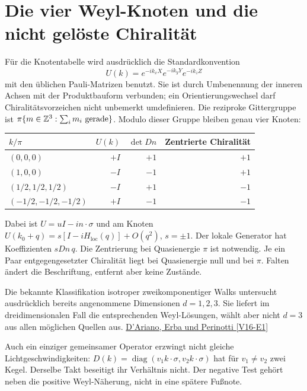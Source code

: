 \section{Die vier Weyl-Knoten und die nicht gelöste Chiralität}
Für die Knotentabelle wird ausdrücklich die Standardkonvention
\begin{equation}
U(k)=e^{-ik_xX}e^{-ik_yY}e^{-ik_zZ}
\end{equation}
mit den üblichen Pauli-Matrizen benutzt. Sie ist durch Umbenennung der inneren Achsen mit der Produktbauform verbunden; ein Orientierungswechsel darf Chiralitätsvorzeichen nicht unbemerkt umdefinieren. Die reziproke Gittergruppe ist $\pi\{m\in\mathbb Z^3:\sum_i m_i\text{ gerade}\}$. Modulo dieser Gruppe bleiben genau vier Knoten:
\begin{center}
\begin{tabular}{lrrr}
\toprule
$k/\pi$ & $U(k)$ & $\det Dn$ & Zentrierte Chiralität\\\midrule
$(0,0,0)$ & $+I$ & $+1$ & $+1$\\
$(1,0,0)$ & $-I$ & $-1$ & $+1$\\
$(1/2,1/2,1/2)$ & $-I$ & $+1$ & $-1$\\
$(-1/2,-1/2,-1/2)$ & $+I$ & $-1$ & $-1$\\\bottomrule
\end{tabular}
\end{center}
Dabei ist $U=uI-in\cdot\sigma$ und am Knoten $U(k_0+q)=s[I-iH_{\mathrm{loc}}(q)]+O(q^2)$, $s=\pm1$. Der lokale Generator hat Koeffizienten $sDn\,q$. Die Zentrierung bei Quasienergie $\pi$ ist notwendig. Je ein Paar entgegengesetzter Chiralität liegt bei Quasienergie null und bei $\pi$. Falten ändert die Beschriftung, entfernt aber keine Zustände.

Die bekannte Klassifikation isotroper zweikomponentiger Walks untersucht ausdrücklich bereits angenommene Dimensionen $d=1,2,3$. Sie liefert im dreidimensionalen Fall die entsprechenden Weyl-Lösungen, wählt aber nicht $d=3$ aus allen möglichen Quellen aus. \href{https://arxiv.org/abs/1708.00826}{D'Ariano, Erba und Perinotti [V16-E1]}

Auch ein einziger gemeinsamer Operator erzwingt nicht gleiche Lichtgeschwindigkeiten: $D(k)=\operatorname{diag}(v_1k\cdot\sigma,v_2k\cdot\sigma)$ hat für $v_1\ne v_2$ zwei Kegel. Derselbe Takt beseitigt ihr Verhältnis nicht. Der negative Test gehört neben die positive Weyl-Näherung, nicht in eine spätere Fußnote.

